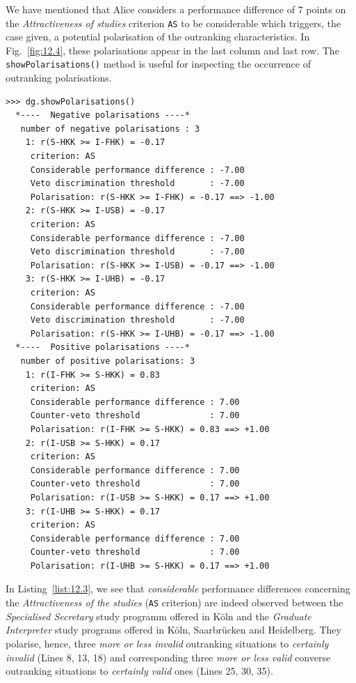 We have mentioned that Alice considers a performance difference of $7$ points on the \emph{Attractiveness of studies} criterion \texttt{AS} to be considerable which triggers, the case given, a potential polarisation of the outranking characteristics. In Fig.~\vref{fig:12.4}, these polarisations appear in the last column and last row. The \texttt{showPolarisations()} method  is useful for inspecting the occurrence of outranking polarisations.
\begin{lstlisting}[caption={Inspecting polarised outranking situations},label=list:12.3]
>>> dg.showPolarisations()
  *----  Negative polarisations ----*
   number of negative polarisations : 3 
    1: r(S-HKK >= I-FHK) = -0.17
     criterion: AS
     Considerable performance difference : -7.00
     Veto discrimination threshold       : -7.00
     Polarisation: r(S-HKK >= I-FHK) = -0.17 ==> -1.00
    2: r(S-HKK >= I-USB) = -0.17
     criterion: AS
     Considerable performance difference : -7.00
     Veto discrimination threshold       : -7.00
     Polarisation: r(S-HKK >= I-USB) = -0.17 ==> -1.00
    3: r(S-HKK >= I-UHB) = -0.17
     criterion: AS
     Considerable performance difference : -7.00
     Veto discrimination threshold       : -7.00
     Polarisation: r(S-HKK >= I-UHB) = -0.17 ==> -1.00
  *----  Positive polarisations ----*
   number of positive polarisations: 3 
    1: r(I-FHK >= S-HKK) = 0.83
     criterion: AS
     Considerable performance difference : 7.00
     Counter-veto threshold              : 7.00
     Polarisation: r(I-FHK >= S-HKK) = 0.83 ==> +1.00
    2: r(I-USB >= S-HKK) = 0.17
     criterion: AS
     Considerable performance difference : 7.00
     Counter-veto threshold              : 7.00
     Polarisation: r(I-USB >= S-HKK) = 0.17 ==> +1.00
    3: r(I-UHB >= S-HKK) = 0.17
     criterion: AS
     Considerable performance difference : 7.00
     Counter-veto threshold              : 7.00
     Polarisation: r(I-UHB >= S-HKK) = 0.17 ==> +1.00
\end{lstlisting}

In Listing~\vref{list:12.3}, we see that \emph{considerable} performance differences concerning the \emph{Attractiveness of the studies} (\texttt{AS} criterion) are indeed observed between the \emph{Specialised Secretary} study programm offered in Köln and the \emph{Graduate Interpreter} study programs offered in Köln, Saarbrücken and Heidelberg. They polarise, hence, three \emph{more or less invalid} outranking situations to \emph{certainly invalid} (Lines 8, 13, 18) and corresponding three \emph{more or less valid} converse outranking situations to \emph{certainly valid} ones (Lines 25, 30, 35). 

